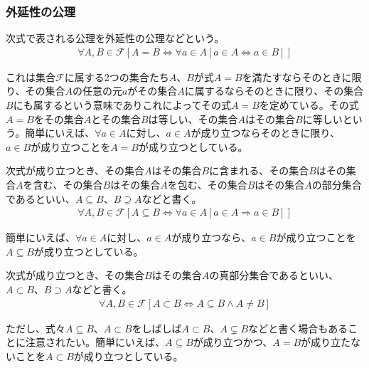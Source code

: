 \documentclass[a4paper]{jsarticle}
\begin{document}
\subsubsection{外延性の公理}%
\begin{axs}
次式で表される公理を外延性の公理などという。
\begin{align*}
\forall A,B\in \mathcal{F}\left[ A = B \Leftrightarrow \forall a \in A[a \in A \Leftrightarrow a \in B]\right]
\end{align*}
\end{axs}
これは集合$\mathcal{F}$に属する2つの集合たち$A$、$B$が式$A = B$を満たすならそのときに限り、その集合$A$の任意の元$a$がその集合$A$に属するならそのときに限り、その集合$B$にも属するという意味でありこれによってその式$A = B$を定めている。その式$A = B$をその集合$A$とその集合$B$は等しい、その集合$A$はその集合$B$に等しいという。簡単にいえば、$\forall a \in A$に対し、$a \in A$が成り立つならそのときに限り、$a \in B$が成り立つことを$A = B$が成り立つとしている。
\begin{dfn}
次式が成り立つとき、その集合$A$はその集合$B$に含まれる、その集合$B$はその集合$A$を含む、その集合$B$はその集合$A$を包む、その集合$B$はその集合$A$の部分集合であるといい、$A \subseteq B$、$B \supseteq A$などと書く。
\begin{align*}
\forall A,B\in \mathcal{F}\left[ A \subseteq B \Leftrightarrow \forall a \in A[a \in A \Rightarrow a \in B ]\right]
\end{align*}
\end{dfn}
簡単にいえば、$\forall a \in A$に対し、$a \in A$が成り立つなら、$a \in B$が成り立つことを$A \subseteq B$が成り立つとしている。
\begin{dfn}
次式が成り立つとき、その集合$B$はその集合$A$の真部分集合であるといい、$A \subset B$、$B \supset A$などと書く。
\begin{align*}
    \forall A,B\in \mathcal{F}[ A \subset B \Leftrightarrow A \subseteq B \land A \neq B]
\end{align*}
\end{dfn}
ただし、式々$A \subseteq B$、$A \subset B$をしばしば$A \subset B、A \subsetneq B$などと書く場合もあることに注意されたい。簡単にいえば、$A \subseteq B$が成り立つかつ、$A = B$が成り立たないことを$A \subset B$が成り立つとしている。
\end{document}
